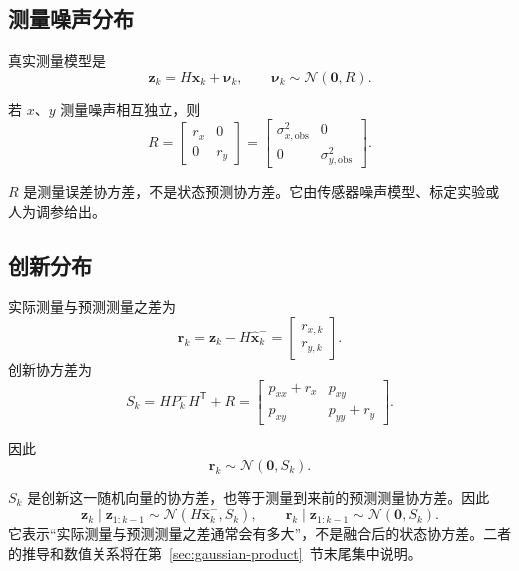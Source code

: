 \documentclass[UTF8,a4paper,11pt]{ctexart}
\newcommand{\prior}{^{-}}
\newcommand{\transpose}{^{\mathsf T}}
\begin{document}
\subsection{测量噪声分布}

真实测量模型是
\begin{equation}
\bm z_k=H\bm x_k+\bm\nu_k,
\qquad
\bm\nu_k\sim\mathcal N(\bm0,R).
\end{equation}

若 $x$、$y$ 测量噪声相互独立，则
\begin{equation}
R=
\begin{bmatrix}
r_x&0\\
0&r_y
\end{bmatrix}
=
\begin{bmatrix}
\sigma_{x,\mathrm{obs}}^2&0\\
0&\sigma_{y,\mathrm{obs}}^2
\end{bmatrix}.
\end{equation}

$R$ 是测量误差协方差，不是状态预测协方差。它由传感器噪声模型、标定实验或人为调参给出。

\subsection{创新分布}

实际测量与预测测量之差为
\begin{equation}
\bm r_k
=\bm z_k-H\hat{\bm x}_k\prior
=\begin{bmatrix}r_{x,k}\\r_{y,k}\end{bmatrix}.
\end{equation}
创新协方差为
\begin{equation}
S_k=HP_k\prior H\transpose+R
=\begin{bmatrix}
p_{xx}+r_x&p_{xy}\\
p_{xy}&p_{yy}+r_y
\end{bmatrix}.
\label{eq:S-expanded}
\end{equation}

因此
\begin{equation}
\bm r_k\sim\mathcal N(\bm0,S_k).
\end{equation}

$S_k$ 是创新这一随机向量的协方差，也等于测量到来前的预测测量协方差。因此
\begin{equation}
\bm z_k\mid\bm z_{1:k-1}
\sim\mathcal N(H\hat{\bm x}_k\prior,S_k),
\qquad
\bm r_k\mid\bm z_{1:k-1}
\sim\mathcal N(\bm0,S_k).
\end{equation}
它表示“实际测量与预测测量之差通常会有多大”，不是融合后的状态协方差。二者的推导和数值关系将在第~\ref{sec:gaussian-product}~节末尾集中说明。
\end{document}
